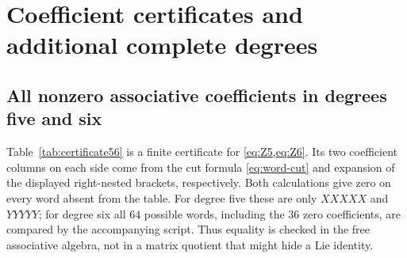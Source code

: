 \section{Coefficient certificates and additional complete degrees}\label{sec:tables}
\subsection{All nonzero associative coefficients in degrees five and six}
Table~\ref{tab:certificate56} is a finite certificate for \cref{eq:Z5,eq:Z6}.
Its two coefficient columns on each side come from the cut formula
\cref{eq:word-cut} and expansion of the displayed right-nested brackets,
respectively. Both calculations give zero on every word absent from the table.
For degree five these are only $XXXXX$ and $YYYYY$; for degree six all $64$ possible
words, including the $36$ zero coefficients, are compared by the accompanying
script. Thus equality is checked in the free associative algebra, not in a
matrix quotient that might hide a Lie identity.

